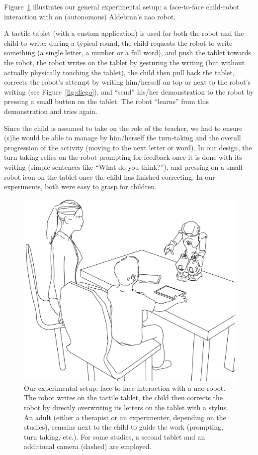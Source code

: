 \documentclass{article}
\begin{document}
Figure~\ref{experimental_setup} illustrates our general experimental setup: a
face-to-face child-robot interaction with an (autonomous) Aldebran's {\sc nao}
robot.

A tactile tablet (with a custom application) is used for both the robot and the
child to write: during a typical round, the child requests the robot to write
something (a single letter, a number or a full word), and push the tablet
towards the robot, the robot writes on the tablet by gesturing the writing (but
without actually physically touching the tablet), the child then pull back the
tablet, corrects the robot's attempt by writing him/herself on top or next to
the robot's writing (see Figure~\ref{fig:diego}), and ``send'' his/her
demonstration to the robot by pressing a small button on the tablet. The robot
``learns'' from this demonstration and tries again.

Since the child is assumed to take on the role of the teacher, we had to ensure
(s)he would be able to manage by him/herself the turn-taking and the overall
progression of the activity (moving to the next letter or word). In our design,
the turn-taking relies on the robot prompting for feedback once it is done with
its writing (simple sentences like ``What do you think?''), and pressing on a
small robot icon on the tablet once the child has finished correcting. In our
experiments, both were easy to grasp for children.


\begin{figure}
    \centering
    \includegraphics[width=0.6\columnwidth]{experimental_setup}
    \caption{\small Our experimental setup: face-to-face interaction with a {\sc
        nao} robot.  The robot writes on the tactile tablet, the child then
        corrects the robot by directly overwriting its letters on the tablet
        with a stylus. An adult (either a therapist or an experimenter,
        depending on the studies), remains next to the child to guide the work
        (prompting, turn taking, etc.). For some studies, a second tablet and an
        additional camera (dashed) are employed.}

    \label{experimental_setup}
\end{figure}
\end{document}

